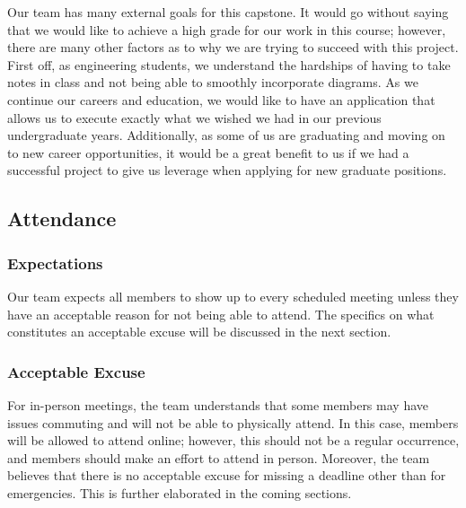 \documentclass{article}
\begin{document}
{

Our team has many external goals for this capstone. It would go without saying 
that we would like to achieve a high grade for our work in this course; 
however, there are many other factors as to why we are trying to succeed with 
this project. First off, as engineering students, we understand the hardships 
of having to take notes in class and not being able to smoothly incorporate 
diagrams. As we continue our careers and education, we would like to have an 
application that allows us to execute exactly what we wished we had in our 
previous undergraduate years.
Additionally, as some of us are graduating and moving on to new career 
opportunities, it would be a great benefit to us if we had a successful
 project to give us leverage when applying for new graduate positions. 


\subsection*{Attendance}

\subsubsection*{Expectations}


Our team expects all members to show up to every scheduled meeting unless they
 have an acceptable reason for not being able to attend. The specifics on what 
 constitutes an acceptable excuse will be discussed in the next section.

\subsubsection*{Acceptable Excuse}


For in-person meetings, the team understands that some members may have issues
 commuting and will not be able to physically attend. In this case, members 
 will be allowed to attend online; however, this should not be a regular 
 occurrence, and members should make an effort to attend in person. 
 Moreover, the team believes that there is no acceptable excuse for missing
 a deadline other than for emergencies. 
 This is further elaborated in the coming sections. 

}
\end{document}

